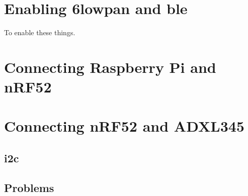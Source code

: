 \section{Enabling \gls{6lowpan} and \gls{ble}}

To enable these things. 

\section{Connecting Raspberry Pi and nRF52}

\section{Connecting nRF52 and ADXL345}


\subsection{\gls{i2c}}


\subsection{Problems}





